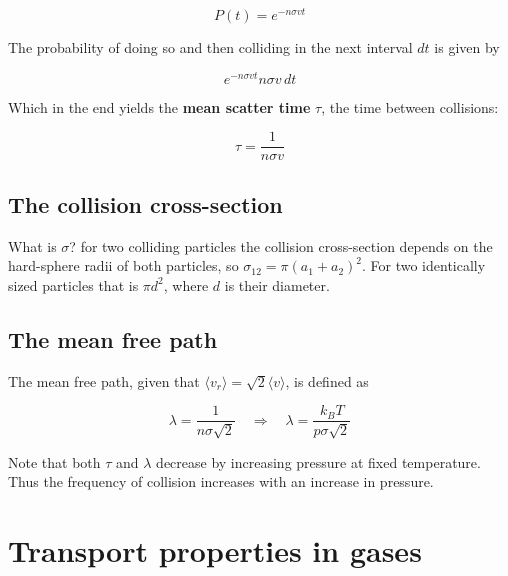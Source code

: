 \documentclass[a4paper]{article}
\begin{document}
\begin{equation}
	P(t)=e^{-n\sigma vt}
\end{equation}

The probability of doing so and then colliding in the next interval $dt$ is given by

\begin{equation}
	e^{-n\sigma vt}n\sigma v\,dt
\end{equation}

Which in the end yields the \textbf{mean scatter time} $\tau$, the time between collisions:

\begin{equation}
	\tau = \frac{1}{n\sigma v}
\end{equation}

\subsection{The collision cross-section}

What is $\sigma$? for two colliding particles the collision cross-section depends on the hard-sphere radii of both particles, so $\sigma_{12}=\pi(a_1+a_2)^2$. For two identically sized particles that is $\pi d^2$, where $d$ is their diameter.

\subsection{The mean free path}

The mean free path, given that $\langle v_r\rangle=\sqrt{2}\langle v\rangle$, is defined as

\begin{equation}
	\lambda = \frac{1}{n\sigma\sqrt{2}}\quad\Rightarrow\quad \lambda = \frac{k_BT}{p\sigma\sqrt{2}}
\end{equation}

Note that both $\tau$ and $\lambda$ decrease by increasing pressure at fixed temperature. Thus the frequency of collision increases with an increase in pressure.

\section{Transport properties in gases}
\end{document}
